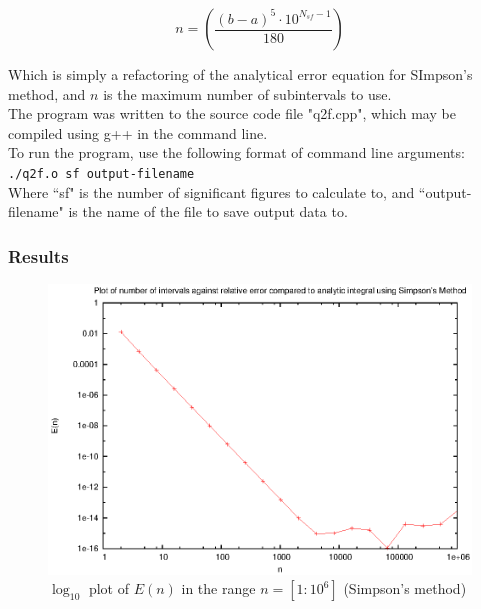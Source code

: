 \documentclass[pdf,color]{UoBnote}
\begin{document}
				\begin{equation}
				n = \left( \frac{(b-a)^5 \cdot 10^{N_{sf}-1}}{180}\right) 
				\end{equation}
				
				Which is simply a refactoring of the analytical error equation for SImpson's method, and $n$ is the maximum number of subintervals to use.\\
				
				The program was written to the source code file "q2f.cpp", which may be compiled using g++ in the command line.\\
				To run the program, use the following format of command line arguments:\\
				\texttt{./q2f.o sf output-filename}\\
				
				Where ``sf" is the number of significant figures to calculate to, and ``output-filename" is the name of the file to save output data to.
				
				\subsubsection{Results}
				
				\begin{figure}[H]
					\centering
						\includegraphics{figures/q2g_computed.eps}
					\caption{$\log_{10}$ plot of $E(n)$ in the range $n = [1:10^{6}]$ (Simpson's method)}
					\label{fig:q2g_computed}
				\end{figure}
				
\end{document}
